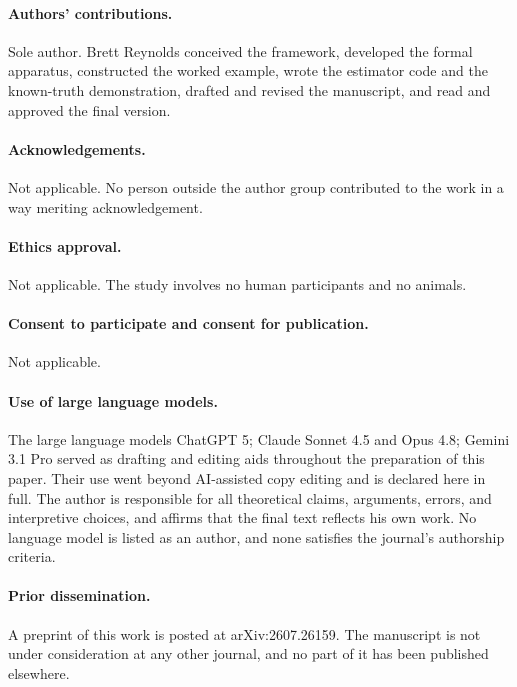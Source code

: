 \documentclass[12pt]{article}
\begin{document}
\paragraph{Authors' contributions.}
Sole author. Brett Reynolds conceived the framework, developed the formal
apparatus, constructed the worked example, wrote the estimator code and the
known-truth demonstration, drafted and revised the manuscript, and read and
approved the final version.

\paragraph{Acknowledgements.}
Not applicable. No person outside the author group contributed to the work in a
way meriting acknowledgement.

\paragraph{Ethics approval.}
Not applicable. The study involves no human participants and no animals.

\paragraph{Consent to participate and consent for publication.}
Not applicable.

\paragraph{Use of large language models.}
The large language models ChatGPT 5; Claude Sonnet 4.5 and Opus 4.8; Gemini 3.1
Pro served as drafting and editing aids throughout the preparation of this
paper. Their use went beyond AI-assisted copy editing and is declared here in
full. The author is responsible for all theoretical claims, arguments, errors,
and interpretive choices, and affirms that the final text reflects his own work.
No language model is listed as an author, and none satisfies the journal's
authorship criteria.

\paragraph{Prior dissemination.}
A preprint of this work is posted at arXiv:2607.26159. The manuscript is not
under consideration at any other journal, and no part of it has been published
elsewhere.
\end{document}
